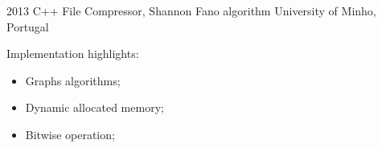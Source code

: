 \documentclass[]{friggeri-cv} %
\begin{document}
\begin{entrylist}


\entry
{2013}
{C++ File Compressor, Shannon Fano algorithm}
{University of Minho, Portugal}
{Implementation highlights: %
\begin{itemize}
  \item Graphs algorithms;
	\item Dynamic allocated memory;
	\item Bitwise operation;
\end{itemize}
}
\end{entrylist}
\end{document}
